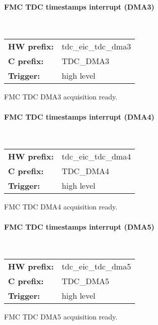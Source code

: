 \paragraph*{FMC TDC timestamps interrupt (DMA3)}\mbox{}\\\vskip 6pt
\begin{small}
\begin{tabular}{l l }
{\bf HW prefix:}  & tdc\_eic\_tdc\_dma3\\
{\bf C prefix:}  & TDC\_DMA3\\
{\bf Trigger:}  & high level\\
\end{tabular}

\end{small}
\vspace{12pt}
FMC TDC DMA3 acquisition ready.
\paragraph*{FMC TDC timestamps interrupt (DMA4)}\mbox{}\\\vskip 6pt
\begin{small}
\begin{tabular}{l l }
{\bf HW prefix:}  & tdc\_eic\_tdc\_dma4\\
{\bf C prefix:}  & TDC\_DMA4\\
{\bf Trigger:}  & high level\\
\end{tabular}

\end{small}
\vspace{12pt}
FMC TDC DMA4 acquisition ready.
\paragraph*{FMC TDC timestamps interrupt (DMA5)}\mbox{}\\\vskip 6pt
\begin{small}
\begin{tabular}{l l }
{\bf HW prefix:}  & tdc\_eic\_tdc\_dma5\\
{\bf C prefix:}  & TDC\_DMA5\\
{\bf Trigger:}  & high level\\
\end{tabular}

\end{small}
\vspace{12pt}
FMC TDC DMA5 acquisition ready.

